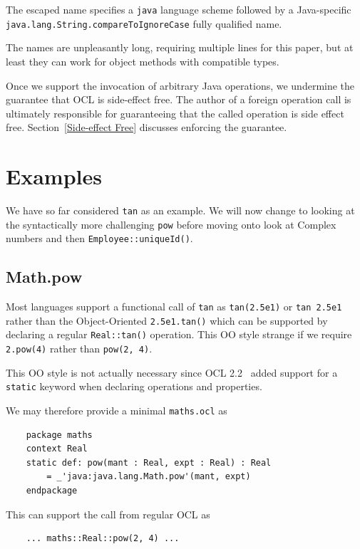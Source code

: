 \documentclass[sigconf]{acmart}
\begin{document}
The escaped name specifies a \verb|java| language scheme followed by a Java-specific \verb|java.lang.String.compareToIgnoreCase| fully qualified name.

The names are unpleasantly long, requiring multiple lines for this paper, but at least they can work for object methods with compatible types.

Once we support the invocation of arbitrary Java operations, we undermine the guarantee that OCL is side-effect free. The author of a foreign operation call is ultimately responsible for guaranteeing that the called operation is side effect free. Section~\ref{Side-effect Free} discusses enforcing the guarantee.

\section{Examples}\label{Examples}

We have so far considered \verb|tan| as an example. We will now change to looking at the syntactically more challenging \verb|pow| before moving onto look at Complex numbers and then \verb|Employee::uniqueId()|. 

\subsection{Math.pow}

Most languages support a functional call of \verb|tan| as \verb|tan(2.5e1)| or \verb|tan 2.5e1| rather than the Object-Oriented \verb|2.5e1.tan()| which can be supported by declaring a regular \verb|Real::tan()| operation. This OO style strange if we require \verb|2.pow(4)| rather than \verb|pow(2, 4)|.

This OO style is not actually necessary since OCL 2.2~\cite{OCL-2.2} added support for a \verb|static| keyword when declaring operations and properties.

We may therefore provide a minimal \verb|maths.ocl| as

\begin{verbatim}
	package maths
	context Real
	static def: pow(mant : Real, expt : Real) : Real
	    = _'java:java.lang.Math.pow'(mant, expt)
	endpackage
\end{verbatim} 

This can support the call from regular OCL as

\begin{verbatim}
	... maths::Real::pow(2, 4) ...
\end{verbatim} 
\end{document}
